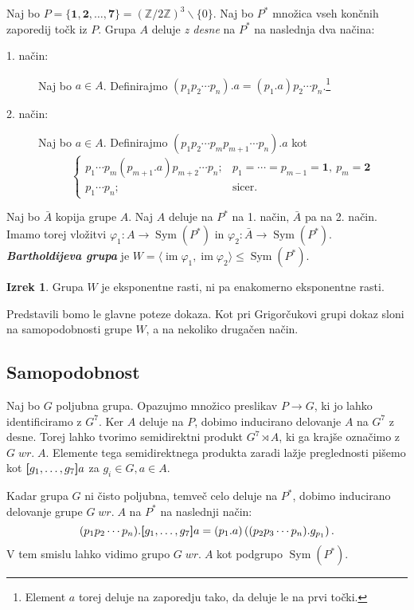 \documentclass[11pt]{book}
\renewcommand{\wreath}{\; wr. \;}
\def\ZZ{\mathbb{Z}}
\def\one{\mathbf{1}}
\def\two{\mathbf{2}}
\def\seven{\mathbf{7}}
\DeclareMathOperator\image{im}
\DeclareMathOperator\Sym{Sym}
\def\definicija{\color{rdeca}\bf\em}
\theoremstyle{definition}
\theoremstyle{zgled}
\theoremstyle{odprtproblem}
\theoremstyle{domacanaloga}
\theoremstyle{izrek}
\newtheorem*{izrek}{Izrek}
\begin{document}
Naj bo $P = \{ \one, \two, \dots, \seven \} = (\ZZ/2\ZZ)^3 \backslash \{ 0 \}$. Naj bo $P^*$ množica vseh končnih zaporedij točk iz $P$. Grupa $A$ deluje {\em z desne} na $P^*$ na naslednja dva načina:
\begin{description}
    \item[1. način:] Naj bo $a \in A$. Definirajmo $(p_1 p_2 \cdots p_n).a = (p_1.a)p_2\cdots p_n$.\footnote{Element $a$ torej deluje na zaporedju tako, da deluje le na prvi točki.}
    \item[2. način:] Naj bo $a \in A$. Definirajmo $(p_1 p_2 \cdots p_m p_{m+1} \cdots p_n).a$ kot
    \[
    \begin{cases}
    p_1 \cdots p_m (p_{m+1}.a) p_{m+2} \cdots p_n; & p_1 = \cdots = p_{m-1} = \one, \ p_m = \two \\
    p_1 \cdots p_n; & \text{sicer.}
    \end{cases}
    \]
\end{description}
Naj bo $\bar A$ kopija grupe $A$. Naj $A$ deluje na $P^*$ na 1. način, $\bar A$ pa na 2. način. Imamo torej vložitvi $\varphi_1 \colon A \to \Sym(P^*)$ in $\varphi_2 \colon \bar A \to \Sym(P^*)$. {\definicija Bartholdijeva grupa} je $W = \langle \image \varphi_1, \image \varphi_2 \rangle \leq \Sym(P^*)$.  

\begin{izrek}
Grupa $W$ je eksponentne rasti, ni pa enakomerno eksponentne rasti.
\end{izrek}

Predstavili bomo le glavne poteze dokaza. Kot pri Grigorčukovi grupi dokaz sloni na samopodobnosti grupe $W$, a na nekoliko drugačen način.

\subsection{Samopodobnost}

Naj bo $G$ poljubna grupa. Opazujmo množico preslikav $P \to G$, ki jo lahko identificiramo z $G^7$. Ker $A$ deluje na $P$, dobimo inducirano delovanje $A$ na $G^7$ z desne. Torej lahko tvorimo semidirektni produkt $G^7 \rtimes A$, ki ga krajše označimo z $G \wreath A$. Elemente tega semidirektnega produkta zaradi lažje preglednosti pišemo kot ${\textbf [} g_1, \dots, g_7 {\textbf ]} a$ za $g_i \in G, a \in A$.

Kadar grupa $G$ ni čisto poljubna, temveč celo deluje na $P^*$, dobimo inducirano delovanje grupe $G \wreath A$ na $P^*$ na naslednji način:
\[
(p_1p_2 \cdots p_n).{\textbf [} g_1, \dots, g_7 {\textbf ]} a = (p_1.a) \left( (p_2p_3\cdots p_n).g_{p_1} \right).
\]
V tem smislu lahko vidimo grupo $G \wreath A$ kot podgrupo $\Sym(P^*)$.
\end{document}
